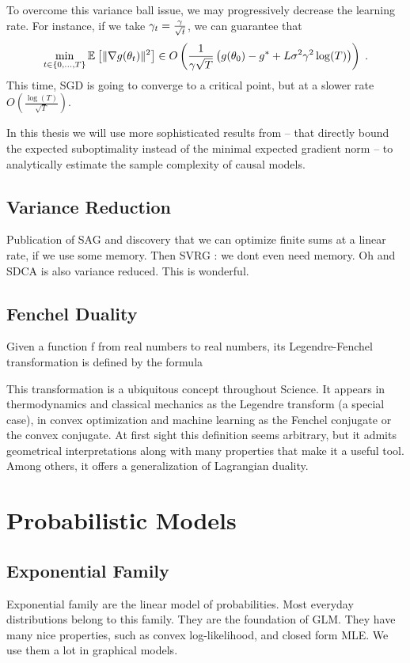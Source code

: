 To overcome this variance ball issue, we may progressively decrease the learning rate. For instance, if we take  $\gamma_t = \frac{\gamma}{\sqrt{t}}$, we can guarantee that
\begin{align}
    \min_{t\in \{0, \dots, T\} } \mathbb{E}_{} \left[ \|\nabla g(\theta_t)\|^2 \right]  
    \in O \left( \frac{1}{\gamma \sqrt{T}} \left ( g(\theta_0) - g^* + L \sigma^2 \gamma^2 \log(T) \right ) \right )  \; .
\end{align}
This time, SGD is going to converge to a critical point, but at a slower rate $O \left( \frac{\log(T)}{\sqrt{T}} \right )$.

In this thesis we will use more sophisticated results from  \citet{moulines2011nonasymptotic} -- that directly bound the expected suboptimality instead of the minimal expected gradient norm -- to analytically estimate the sample complexity of causal models.

\subsection{Variance Reduction}
Publication of SAG and discovery that we can optimize finite sums at a linear rate, if we use some memory. Then SVRG : we dont even need memory. Oh and SDCA is also variance reduced. This is wonderful.

\subsection{Fenchel Duality}
Given a function f from real numbers to real numbers, its Legendre-Fenchel transformation is defined by the formula
 
This transformation is a ubiquitous concept throughout Science. It appears in thermodynamics and classical mechanics as the Legendre transform (a special case), in convex optimization and machine learning as the Fenchel conjugate or the convex conjugate. At first sight this definition seems arbitrary, but it admits geometrical interpretations along with many properties that make it a useful tool. Among others, it offers a generalization of Lagrangian duality.

\section{Probabilistic Models}
\subsection{Exponential Family}
Exponential family are the linear model of probabilities. 
Most everyday distributions belong to this family.
They are the foundation of GLM.
They have many nice properties, such as convex log-likelihood, and closed form MLE.
We use them a lot in graphical models. 

